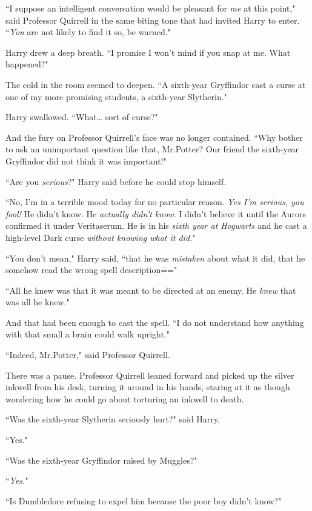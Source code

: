``I suppose an intelligent conversation would be pleasant for \emph{me} at this point," said Professor Quirrell in the same biting tone that had invited Harry to enter. ``\emph{You} are not likely to find it so, be warned."

Harry drew a deep breath. ``I promise I won't mind if you snap at me. What happened?"

The cold in the room seemed to deepen. ``A sixth-year Gryffindor cast a curse at one of my more promising students, a sixth-year Slytherin."

Harry swallowed. ``What{\ldots} sort of curse?"

And the fury on Professor Quirrell's face was no longer contained. ``Why bother to ask an unimportant question like that, Mr.\?Potter? Our friend the sixth-year Gryffindor did not think it was important!"

``Are you \emph{serious}?" Harry said before he could stop himself.

``No, I'm in a terrible mood today for no particular reason. \emph{Yes I'm serious, you fool!} He didn't know. He \emph{actually didn't know}. I didn't believe it until the Aurors confirmed it under Veritaserum. He is in his \emph{sixth year at Hogwarts} and he cast a high-level Dark curse \emph{without knowing what it did.}"

``You don't mean," Harry said, ``that he was \emph{mistaken} about what it did, that he somehow read the wrong spell description\==="

``All he knew was that it was meant to be directed at an enemy. He \emph{knew} that was all he knew."

And that had been enough to cast the spell. ``I do not understand how anything with that small a brain could walk upright."

``Indeed, Mr.\?Potter," said Professor Quirrell.

There was a pause. Professor Quirrell leaned forward and picked up the silver inkwell from his desk, turning it around in his hands, staring at it as though wondering how he could go about torturing an inkwell to death.

``Was the sixth-year Slytherin seriously hurt?" said Harry.

``Yes."

``Was the sixth-year Gryffindor raised by Muggles?"

``\emph{Yes.}"

``Is Dumbledore refusing to expel him because the poor boy didn't know?"

